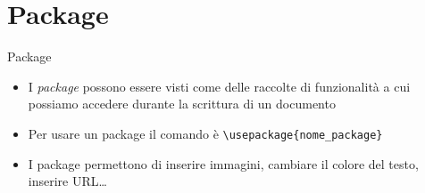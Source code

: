\section{Package}
\begin{frame}{Package}

\begin{itemize}
\item I \emph{package} possono essere visti come delle raccolte di funzionalità a cui possiamo accedere durante la scrittura di un documento

\vfill

\item Per usare un package il comando è 
\texttt{\textbackslash{}usepackage\{nome\_package\}}

\vfill

\item I package permettono di inserire immagini, cambiare il colore del testo,
inserire URL\dots{}

\end{itemize}

\end{frame}